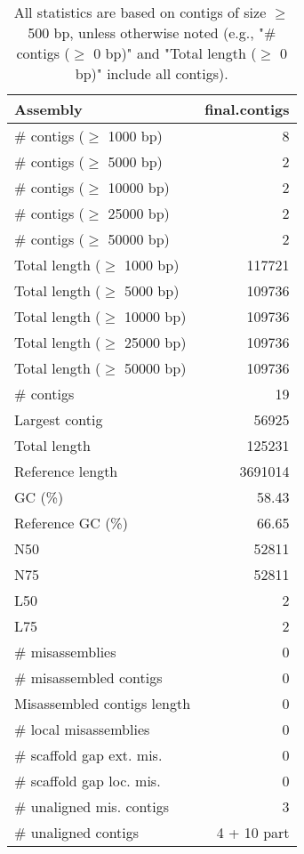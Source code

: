 \documentclass[12pt,a4paper]{article}
\begin{document}
\begin{table}[ht]
\begin{center}
\caption{All statistics are based on contigs of size $\geq$ 500 bp, unless otherwise noted (e.g., "\# contigs ($\geq$ 0 bp)" and "Total length ($\geq$ 0 bp)" include all contigs).}
\begin{tabular}{|l*{1}{|r}|}
\hline
Assembly & final.contigs \\ \hline
\# contigs ($\geq$ 1000 bp) & 8 \\ \hline
\# contigs ($\geq$ 5000 bp) & 2 \\ \hline
\# contigs ($\geq$ 10000 bp) & 2 \\ \hline
\# contigs ($\geq$ 25000 bp) & 2 \\ \hline
\# contigs ($\geq$ 50000 bp) & 2 \\ \hline
Total length ($\geq$ 1000 bp) & 117721 \\ \hline
Total length ($\geq$ 5000 bp) & 109736 \\ \hline
Total length ($\geq$ 10000 bp) & 109736 \\ \hline
Total length ($\geq$ 25000 bp) & 109736 \\ \hline
Total length ($\geq$ 50000 bp) & 109736 \\ \hline
\# contigs & 19 \\ \hline
Largest contig & 56925 \\ \hline
Total length & 125231 \\ \hline
Reference length & 3691014 \\ \hline
GC (\%) & 58.43 \\ \hline
Reference GC (\%) & 66.65 \\ \hline
N50 & 52811 \\ \hline
N75 & 52811 \\ \hline
L50 & 2 \\ \hline
L75 & 2 \\ \hline
\# misassemblies & 0 \\ \hline
\# misassembled contigs & 0 \\ \hline
Misassembled contigs length & 0 \\ \hline
\# local misassemblies & 0 \\ \hline
\# scaffold gap ext. mis. & 0 \\ \hline
\# scaffold gap loc. mis. & 0 \\ \hline
\# unaligned mis. contigs & 3 \\ \hline
\# unaligned contigs & 4 + 10 part \\ \hline

\end{tabular}
\end{center}
\end{table}
\end{document}
